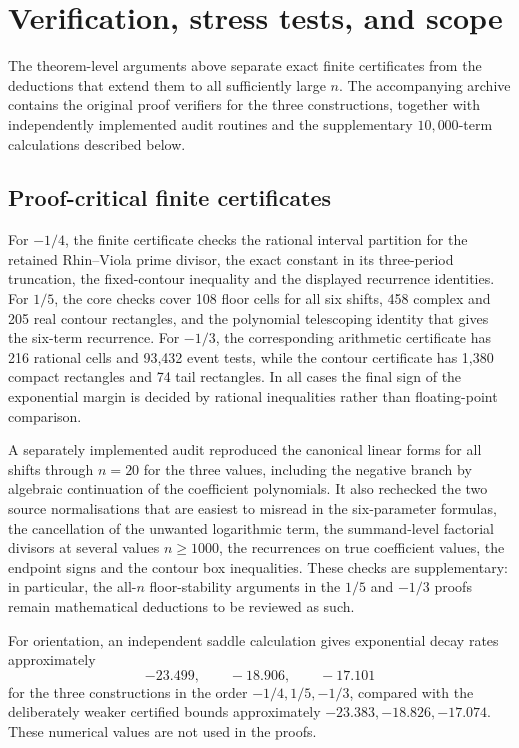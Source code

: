 \documentclass[11pt]{amsart}
\theoremstyle{plain}
\theoremstyle{remark}\newtheorem{remark}[theorem]{Remark}
\numberwithin{equation}{section}
\begin{document}
\section{Verification, stress tests, and scope}\label{sec:verification-combined}
The theorem-level arguments above separate exact finite certificates from the deductions that extend them to all sufficiently large $n$.  The accompanying archive contains the original proof verifiers for the three constructions, together with independently implemented audit routines and the supplementary $10{,}000$-term calculations described below.

\subsection{Proof-critical finite certificates}
For $-1/4$, the finite certificate checks the rational interval partition for the retained Rhin--Viola prime divisor, the exact constant in its three-period truncation, the fixed-contour inequality and the displayed recurrence identities.  For $1/5$, the core checks cover 108 floor cells for all six shifts, 458 complex and 205 real contour rectangles, and the polynomial telescoping identity that gives the six-term recurrence.  For $-1/3$, the corresponding arithmetic certificate has 216 rational cells and 93,432 event tests, while the contour certificate has 1,380 compact rectangles and 74 tail rectangles.  In all cases the final sign of the exponential margin is decided by rational inequalities rather than floating-point comparison.

A separately implemented audit reproduced the canonical linear forms for all shifts through $n=20$ for the three values, including the negative branch by algebraic continuation of the coefficient polynomials.  It also rechecked the two source normalisations that are easiest to misread in the six-parameter formulas, the cancellation of the unwanted logarithmic term, the summand-level factorial divisors at several values $n\ge1000$, the recurrences on true coefficient values, the endpoint signs and the contour box inequalities.  These checks are supplementary: in particular, the all-$n$ floor-stability arguments in the $1/5$ and $-1/3$ proofs remain mathematical deductions to be reviewed as such.

For orientation, an independent saddle calculation gives exponential decay rates approximately
\[
 -23.499,\qquad -18.906,\qquad -17.101
\]
for the three constructions in the order $-1/4,1/5,-1/3$, compared with the deliberately weaker certified bounds approximately $-23.383,-18.826,-17.074$.  These numerical values are not used in the proofs.
\end{document}
